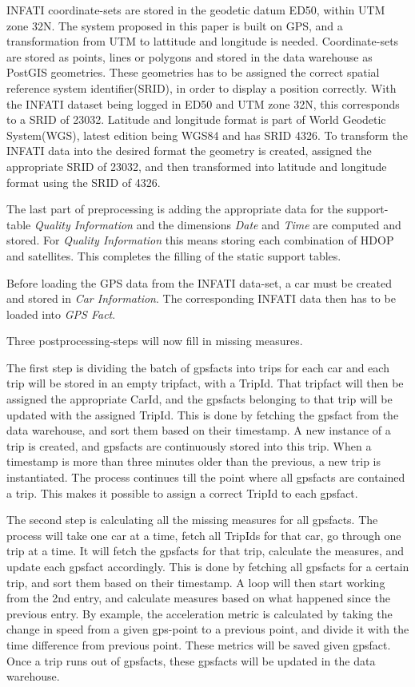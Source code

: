 INFATI coordinate-sets are stored in the geodetic datum ED50, within UTM zone 32N. The system proposed in this paper is built on GPS, and a transformation from UTM to lattitude and longitude is needed. Coordinate-sets are stored as points, lines or polygons and stored in the data warehouse as PostGIS\cite{postgis} geometries. These geometries has to be assigned the correct spatial reference system identifier(SRID), in order to display a position correctly. With the INFATI dataset being logged in ED50 and UTM zone 32N, this corresponds to a SRID of 23032\cite{UTM32N}. Latitude and longitude format is part of World Geodetic System(WGS), latest edition being WGS84 and has SRID 4326\cite{WGS84}. To transform the INFATI data into the desired format the geometry is created, assigned the appropriate SRID of 23032, and then transformed into latitude and longitude format using the SRID of 4326.

The last part of preprocessing is adding the appropriate data for the support-table \textit{Quality Information} and the dimensions \textit{Date} and \textit{Time} are computed and stored. For \textit{Quality Information} this means storing each combination of HDOP and satellites. This completes the filling of the static support tables.

Before loading the GPS data from the INFATI data-set, a car must be created and stored in \textit{Car Information}. The corresponding INFATI data then has to be loaded into \textit{GPS Fact}. 

Three postprocessing-steps will now fill in missing measures.

The first step is dividing the batch of gpsfacts into trips for each car and each trip will be stored in an empty tripfact, with a TripId. That tripfact will then be assigned the appropriate CarId, and the gpsfacts belonging to that trip will be updated with the assigned TripId. This is done by fetching the gpsfact from the data warehouse, and sort them based on their timestamp. A new instance of a trip is created, and gpsfacts are continuously stored into this trip. When a timestamp is more than three minutes older than the previous, a new trip is instantiated. The process continues till the point where all gpsfacts are contained a trip. This makes it possible to  assign a correct TripId to each gpsfact.

The second step is calculating all the missing measures for all gpsfacts. The process will take one car at a time, fetch all TripIds for that car, go through one trip at a time. It will fetch the gpsfacts for that trip, calculate the measures, and update each gpsfact accordingly. This is done by fetching all gpsfacts for a certain trip, and sort them based on their timestamp. A loop will then start working from the 2nd entry, and calculate measures based on what happened since the previous entry.  By example, the acceleration metric is calculated by taking the change in speed from a given gps-point to a previous point, and divide it with the time difference from previous point. These metrics will be saved given gpsfact. Once a trip runs out of gpsfacts, these gpsfacts will be updated in the data warehouse.

